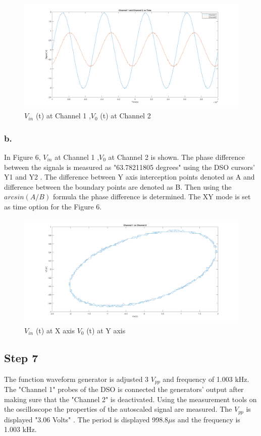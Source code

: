 \documentclass[letterpaper,12pt]{article}
\begin{document}
\begin{figure}[h]
	\caption{\( V_{in}\) (t) at Channel 1 ,\( V_0 \) (t) at Channel 2  }
	\centering
	\includegraphics[width=1\textwidth]{6a.png}
\end{figure}

\subsubsection{b.}
In Figure 6, \( V_{in}\) at Channel 1 ,\( V_0 \) at Channel 2 is shown. The phase difference between the signals is measured as "63.78211805 degrees" using the DSO cursors' Y1 and Y2 . The difference between Y axis interception points denoted as A and  difference between the boundary points are denoted as B. Then using the \(arcsin({A}/{B})\) formula the phase difference is determined. The XY mode is set as time option for the Figure 6.
\begin{figure}[h]
	\caption{\( V_{in}\) (t) at X axis \( V_0 \) (t) at Y axis  }
	\centering
	\includegraphics[width=1\textwidth]{6b.png}
\end{figure}

\subsection{Step 7}
The function waveform generator is adjusted 3 \(V_{pp}\) and frequency of 1.003 kHz. The "Channel 1" probes of the DSO is connected the generators' output after making sure that the "Channel 2" is deactivated. Using the measurement tools on the oscilloscope the properties of the autoscaled signal are measured. The  \(V_{pp}\) is displayed "3.06 Volts" . The period is displayed 998.8\( \mu \)s and the frequency is 1.003 kHz.
\end{document}
